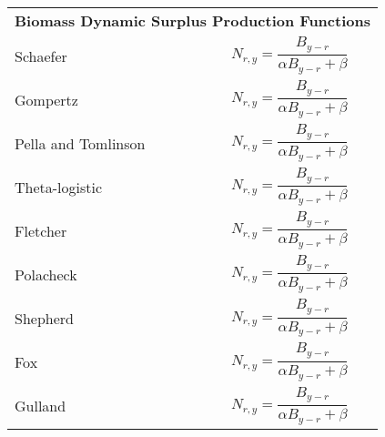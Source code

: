 \documentclass[11pt]{article}
\begin{document}
\begin{tabular}{lp{10cm}}
\multicolumn{2}{l}{\textbf{Biomass Dynamic Surplus Production Functions}} \\
\addlinespace
Schaefer 		& \begin{equation} N_{r,y} = \frac{B_{y-r}}{\alpha B_{y-r} + \beta} \end{equation} \\
Gompertz		& \begin{equation} N_{r,y} = \frac{B_{y-r}}{\alpha B_{y-r} + \beta} \end{equation} \\
Pella and Tomlinson	& \begin{equation} N_{r,y} = \frac{B_{y-r}}{\alpha B_{y-r} + \beta} \end{equation} \\
Theta-logistic		& \begin{equation} N_{r,y} = \frac{B_{y-r}}{\alpha B_{y-r} + \beta} \end{equation} \\
Fletcher		& \begin{equation} N_{r,y} = \frac{B_{y-r}}{\alpha B_{y-r} + \beta} \end{equation} \\
Polacheck		& \begin{equation} N_{r,y} = \frac{B_{y-r}}{\alpha B_{y-r} + \beta} \end{equation} \\
Shepherd		& \begin{equation} N_{r,y} = \frac{B_{y-r}}{\alpha B_{y-r} + \beta} \end{equation} \\
Fox			& \begin{equation} N_{r,y} = \frac{B_{y-r}}{\alpha B_{y-r} + \beta} \end{equation} \\
Gulland			& \begin{equation} N_{r,y} = \frac{B_{y-r}}{\alpha B_{y-r} + \beta} \end{equation} \\
\bottomrule


\end{tabular}
\end{document}
